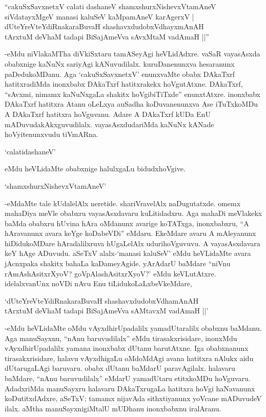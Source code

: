 \begin{shloka}
``cakuSxSavxnetxV calati dashaneV shamxshurxNishevxVtamAneV\\
siVdatayxMgeV manasi kaluSeV kaMpamAneV karAgerxV |\\
dUteYreVteYdiRnakaraBuvaH shashavxdudobxVdhayxmAnAH\\
tArxtuM deVhaM tadapi BiSajAmeVva sAvxMtaM vadAmaH ||''
\end{shloka}

-eMdu niVlakaMTha diVkiSxtaru tamASeyAgi heVLidAdxre. {}vaSaR vayasAsxda obabxnige kaNuNx sariyAgi kANuvudilalx. kuruDanenunxva hesaranunx paDedukoMDanu. Aga `cakuSxSavxnetxV' enunxvaMte obabx DAkaTxrf hatitxradiMda inonxbabx DAkaTxrf hatitxrakekx hoVgutAtxne. DAkaTxrf, ``sAvxmi, nimamx kaNuNxgaLa shakitx hoVgibiTiTxde'' enunxtAtxre. inonxbabx DAkaTxrf hatitxra Atanu oLeLxya auSadha koDuvanenunxva Ase iTuTxkoMDu A DAkaTxrf hatitxra hoVguvanu. Adare A DAkaTxrf kUDa EnU mADuvudakAkxguvudilalx. vayasAsxdudariMda kaNuNx kANade hoVyitenunxvudu tiVmARna.

`calatidashaneV'

eMdu heVLidaMte obabxnige halulxgaLu bidudxhoVgive.

\begin{shloka}
`shamxshurxNishevxVtamAneV'
\end{shloka}

-eMdaMte tale kUdalelAlx neretide. shariVravelAlx naDugutatxde. omemx mahaDiya meVle obabxru vayasAsxdavaru kuLitidadxru. Aga mahaDi meVlakekx baMda obabxru hUvina hAra oMdanunx avarige koTATxga, inonxbabxru, ``A hAravanunx avara keYge koDabeVDi'' eMdaru. EkeMdare avaru A mAleyanunx hiDidukoMDare hAradalilxruva hUgaLelAlx udurihoVguvuvu. A vayasAsxdavara keY hAge ADuvudu. aSeTxV alalx-`manasi kaluSeV' eMdu heVLidaMte avara jAcnxpaka shakitx bahaLa kaDameyAgide. yArAdarU baMdare ``niVnu rAmAshAsitxrXyoV? goVpAlashAsitxrXyoV?' eMdu keVLutAtxre. idelalxvanUnx noVDi nAvu Enu tiLidukoLaLxbeVkeMdare,

\begin{shloka}
`dUteYreVteYdiRnakaraBuvaH shashavxdudobxVdhamAnAH\\
tArxtuM deVhaM tadapi BiSajAmeVva sAMtavxM vadAmaH ||'
\end{shloka}

-eMdu heVLidaMte oMdu vAyxdhirUpadalilx yamadUtaralilx obabxnu baMdanu. Aga manuSayxnu, ``nAnu baruvudilalx'' eMdu tirasakxrisidare, inonxMdu vAyxdhirUpadalilx yamana inonxbabx dUtanu barutAtxne. Iga obabxnanunx tirasakxrisidare, halavu vAyxdhigaLu oMdoMdAgi avana hatitxra nAlukx aidu dUtarugaLAgi baruvaru. obabx dUtanu baMdarU paravAgilalx. halavaru baMdare, ``nAnu baruvudilalx'' eMdarU yamadUtaru etitxkoMDu hoVguvaru. AdadxriMda manuSayxru halavaru DAkaTxrugaLa hatitxra hoVgi haNavanunx koDutitxdAdxre, aSeTxV; tamamx nijavAda sithxtiyanunx yoVcane mADuvudeV ilalx. aMtha manuSayxnigiMtalU mUDhanu inonxbabxnu iralAranu.

